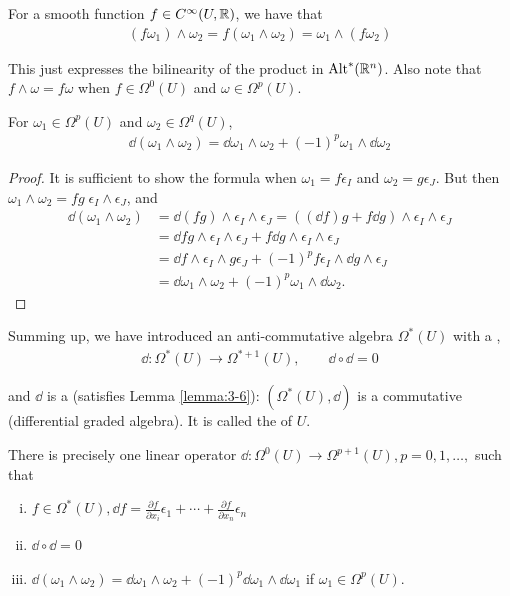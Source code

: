 For a smooth function $f\in C^\infty(U, {\mathbb{R}})$, we have that
\begin{align*}
  (f\omega_1)\wedge\omega_2 = f(\omega_1\wedge\omega_2) = \omega_1\wedge(f\omega_2)
\end{align*}

This just expresses the bilinearity of the product in $\operatorname{Alt}^{*}({\mathbb{R}}^n)$. Also note that 
$f\wedge\omega = f\omega$ when $f\in\Omega^0(U)$ and $\omega\in\Omega^p(U)$.

\begin{lemma}\label{lemma:3-6}
For $\omega_1\in\Omega^p(U)$ and $\omega_2\in\Omega^q(U)$,
\begin{align*}
  \dd(\omega_1\wedge\omega_2) = \dd\omega_1\wedge\omega_2 + (-1)^p\omega_1\wedge\dd\omega_2
\end{align*}
\end{lemma}

\begin{proof}
  It is sufficient to show the formula when $\omega_1=f\epsilon_I$ and $\omega_2=g\epsilon_J$. But 
  then $\omega_1\wedge\omega_2 = fg\;\epsilon_I\wedge\epsilon_J$, and 
  \begin{align*}
    \dd(\omega_1\wedge\omega_2) 
    & = \dd(fg)\wedge\epsilon_{I}\wedge\epsilon_{J}=((\!\dd f)g+f\dd g)\wedge\epsilon_{I}\wedge\epsilon_{J} \\
    & = \dd fg\wedge\epsilon_{I}\wedge\epsilon_{J}+f\dd g\wedge\epsilon_{I}\wedge\epsilon_{J} \\
    & = \dd f\wedge\epsilon_{I}\wedge g\epsilon_{J}+(-1)^{p}f\epsilon_{I}\wedge \dd g\wedge\epsilon_{J} \\
    & = \dd\omega_{1}\wedge\omega_{2}+(-1)^{p}\omega_{1}\wedge \dd\omega_{2}. 
  \end{align*}
\end{proof}

Summing up, we have introduced an anti-commutative algebra $\Omega^*(U)$ with a ,
\begin{align*}
  \dd:\Omega^*(U)\to\Omega^{*+1}(U), \qquad \dd\circ\dd = 0
\end{align*}

and $\dd$ is a  (satisfies Lemma \ref{lemma:3-6}): $(\Omega^*(U), \dd)$ is a commutative 
(differential graded algebra). It is called the  of $U$.

\begin{theorem}\label{theorem:3-7}
There is precisely one linear operator $\dd:\Omega^0(U)\to\Omega^{p+1}(U), p = 0,1, \ldots,$ such that  
\begin{enumerate}[(i)]
  \item $f\in\Omega^*(U), \dd f = \frac{\partial f }{\partial x_i }\epsilon_1 + \cdots + \frac{\partial f}{\partial x_n}\epsilon_n$
  \item $\dd\circ\dd = 0$
  \item $\dd(\omega_1\wedge\omega_2) = \dd\omega_1\wedge\omega_2 + (-1)^p\dd\omega_1\wedge\dd\omega_1$ if $\omega_1\in\Omega^p(U)$.
\end{enumerate}
\end{theorem}

